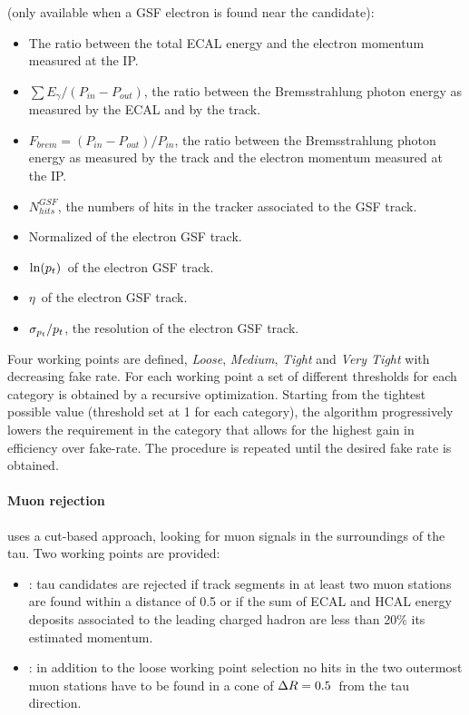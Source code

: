  (only available when a GSF electron is found near the candidate):
\begin{itemize}
\item The ratio between the total ECAL energy and the electron momentum measured at the IP.
\item $\sum E_{\gamma}/(P_{in}-P_{out})$, the ratio between the Bremsstrahlung photon energy as measured by the ECAL and by the track.
\item $F_{brem}=(P_{in}-P_{out})/P_{in}$, the ratio between the Bremsstrahlung photon energy as measured by the track and the electron momentum measured at the IP.
\item $N_{hits}^{GSF}$, the numbers of hits in the tracker associated to the GSF track.
\item Normalized \chisq of the electron GSF track.
\item $\ln (p_{t})$\ of the electron GSF track.
\item $\eta$\ of the electron GSF track.
\item $\sigma_{p_{t}}/p_{t}$, the \pT resolution of the electron GSF track.
\end{itemize}

Four working points are defined, \emph{Loose}, \emph{Medium}, \emph{Tight} and \emph{Very Tight} with decreasing fake rate. For each working point a set of different thresholds for each category is obtained by a recursive optimization. Starting from the tightest possible value (threshold set at 1 for each category), the algorithm progressively lowers the requirement in the category that allows for the highest gain in efficiency over fake-rate. The procedure is repeated until the desired fake rate is obtained.

\paragraph{Muon rejection} uses a cut-based approach, looking for muon signals in the surroundings of the tau. Two working points are provided:

\begin{itemize}
\item {}: tau candidates are rejected if track segments in at least two muon stations are found within a \DR distance of 0.5 or if the sum of ECAL and HCAL energy deposits associated to the leading charged hadron are less than 20\% its estimated momentum.
\item {}: in addition to the loose working point selection no hits in the two outermost muon stations have to be found in a cone of $\Delta R = 0.5$\ from the tau direction.
\end{itemize}

